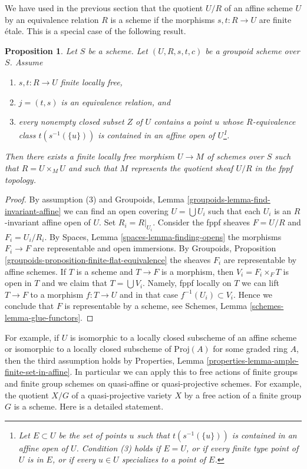 \documentclass{stacks-project}
\theoremstyle{plain}
\newtheorem{proposition}[subsection]{Proposition}
\theoremstyle{definition}
\theoremstyle{remark}
\numberwithin{equation}{subsection}
\begin{document}
\noindent
We have used in the previous section that the quotient $U/R$ of an
affine scheme $U$ by an equivalence relation $R$ is a scheme if the
morphisms $s, t : R \to U$ are finite \'etale. This is a special case
of the following result.

\begin{proposition}
\label{proposition-finite-flat-equivalence-global}
Let $S$ be a scheme.
Let $(U, R, s, t, c)$ be a groupoid scheme over $S$.
Assume
\begin{enumerate}
\item $s, t : R \to U$ finite locally free,
\item $j = (t, s)$ is an equivalence relation, and
\item every nonempty closed subset $Z$ of $U$ contains a point
$u$ whose $R$-equivalence class $t(s^{-1}(\{u\}))$ is contained
in an affine open of $U$\footnote{Let $E \subset U$ be the
set of points $u$ such that $t(s^{-1}(\{u\}))$
is contained in an affine open of $U$. Condition (3) holds
if $E = U$, or if every finite type point of $U$ is in $E$, or
if every $u \in U$ specializes to a point of $E$.}.
\end{enumerate}
Then there exists a finite locally free morphism $U \to M$
of schemes over $S$ such that $R = U \times_M U$ and such that $M$
represents the quotient sheaf $U/R$ in the fppf topology.
\end{proposition}

\begin{proof}
By assumption (3) and
Groupoids, Lemma \ref{groupoids-lemma-find-invariant-affine}
we can find an open covering $U = \bigcup U_i$ such that each $U_i$
is an $R$-invariant affine open of $U$. Set $R_i = R|_{U_i}$.
Consider the fppf sheaves $F = U/R$ and $F_i = U_i/R_i$.
By Spaces, Lemma \ref{spaces-lemma-finding-opens} the morphisms
$F_i \to F$ are representable and open immersions.
By Groupoids, Proposition \ref{groupoids-proposition-finite-flat-equivalence}
the sheaves $F_i$ are representable by affine schemes.
If $T$ is a scheme and $T \to F$ is a morphism, then $V_i = F_i \times_F T$
is open in $T$ and we claim that $T = \bigcup V_i$. Namely,
fppf locally on $T$ we can lift $T \to F$ to a morphism
$f : T \to U$ and in that case $f^{-1}(U_i) \subset V_i$.
Hence we conclude that $F$ is representable by a scheme, see
Schemes, Lemma \ref{schemes-lemma-glue-functors}.
\end{proof}

\noindent
For example, if $U$ is isomorphic to a locally closed subscheme of an
affine scheme or isomorphic to a locally closed subscheme of
$\text{Proj}(A)$ for some graded ring $A$, then the third assumption holds by
Properties, Lemma \ref{properties-lemma-ample-finite-set-in-affine}.
In particular we can apply this to free actions of finite groups and
finite group schemes on quasi-affine or quasi-projective schemes.
For example, the quotient $X/G$ of a quasi-projective variety
$X$ by a free action of a finite group $G$ is a scheme. Here is a
detailed statement.
\end{document}

